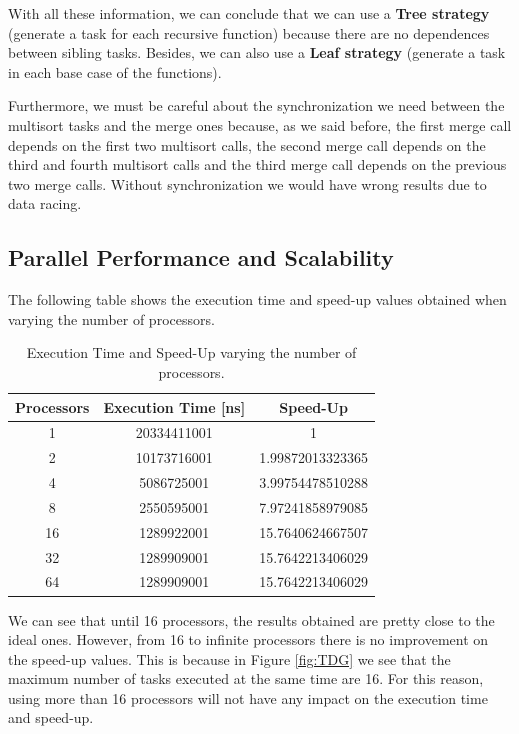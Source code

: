 \documentclass[12pt, a4paper]{article}
\begin{document}
With all these information, we can conclude that we can use a \textbf{Tree strategy} (generate a task for each recursive function) because there are no dependences between sibling tasks. Besides, we can also use a \textbf{Leaf strategy} (generate a task in each base case of the functions).

Furthermore, we must be careful about the synchronization we need between the multisort tasks and the merge ones because, as we said before, the first merge call depends on the first two multisort calls, the second merge call depends on the third and fourth multisort calls and the third merge call depends on the previous two merge calls. Without synchronization we would have wrong results due to data racing.

\subsection{Parallel Performance and Scalability}

The following table shows the execution time and speed-up values obtained when varying the number of processors.

\begin{table}[H]
\centering
\begin{tabular}{ |c|c|c| } 
 \hline
 \textbf{Processors} & \textbf{Execution Time [ns]} & \textbf{Speed-Up} \\ 
 \hline
 \hline
	1	& 20334411001	& 1 \\
	 \hline
	2	& 10173716001	& 1.99872013323365 \\
	 \hline
	4	& 5086725001	& 3.99754478510288 \\
	 \hline
	8	& 2550595001	& 7.97241858979085 \\
	 \hline
	16	& 1289922001	& 15.7640624667507 \\
	 \hline
	32	& 1289909001	& 15.7642213406029 \\
	 \hline
	64	& 1289909001	& 15.7642213406029 \\
 \hline
\end{tabular}
 
 \label{tab:Scalability_S1}
\caption{Execution Time and Speed-Up varying the number of processors.}
\end{table}

We can see that until 16 processors, the results obtained are pretty close to the ideal ones. However, from 16 to infinite processors there is no improvement on the speed-up values. This is because in Figure \ref{fig:TDG} we see that the maximum number of tasks executed at the same time are 16. For this reason, using more than 16 processors will not have any impact on the execution time and speed-up.
\end{document}
